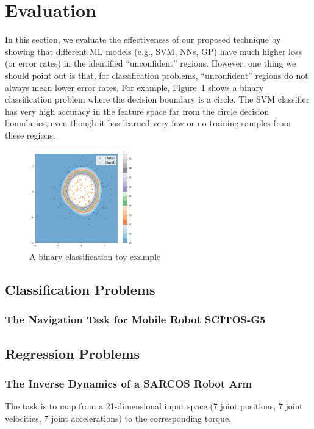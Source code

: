 \section{Evaluation}
\label{sec:evaluation}

In this section, we evaluate the effectiveness of our proposed technique by showing that different ML models (e.g., SVM, NNs, GP) have much higher loss (or error rates)  in the  identified ``unconfident'' regions.  However, one thing we should point out is  that, for classification problems,  ``unconfident'' regions do not always mean lower error rates. For example, Figure~\ref{fig:toy3} shows a binary classification problem where the decision boundary is a circle.  The SVM classifier has very high accuracy in the feature space far from the circle decision boundaries, even though it has learned very few or no training samples from these regions.  
\begin{figure}[t]
\centering
\includegraphics[width=0.4\textwidth]{FIG/toy3.png}
\caption{A binary classification toy  example}
\label{fig:toy3}
\end{figure}


\subsection{Classification Problems}

\subsubsection{The Navigation Task for Mobile Robot SCITOS-G5~\cite{Dua:2017}}




\subsection{Regression Problems}

\subsubsection{The Inverse Dynamics of a  SARCOS Robot Arm~\cite{SARCOS}}
The task is to map from a 21-dimensional input space (7 joint positions, 7 joint velocities, 7 joint accelerations) to the corresponding torque.



